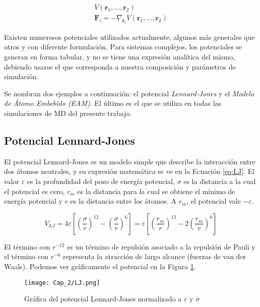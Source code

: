 \begin{eqnarray}
V(\mathbf{r}_{1},...,\mathbf{r}_{2})
\label{C2:eq:pot}\\
\mathbf{F}_{i} = -\nabla_{\mathbf{r}_{i}}V(\mathbf{r}_{1},...,\mathbf{r}_{2})
\label{C2:eq:potfza}
\end{eqnarray}

Existen numerosos potenciales utilizados actualmente, algunos más generales que otros y con diferente formulación. Para sistemas complejos, los potenciales se generan en forma tabular, y no se tiene una expresión analítica del mismo, debiendo usarse el que corresponda a nuestra composición y parámetros de simulación.

Se nombran dos ejemplos a continuación: el potencial \textit{Lennard-Jones} y el \textit{Modelo de Átomo Embebido (EAM)}. El último es el que se utiliza en todas las simulaciones de MD del presente trabajo.

\subsection{Potencial Lennard-Jones}
\label{SS2_3_1}

El potencial Lennard-Jones es un modelo simple que describe la interacción entre dos 	átomos neutrales, y su expresión matemática se ve en la Ecuación \ref{eq:LJ}. El valor $\varepsilon$ es la profundidad del pozo de energía potencial, $\sigma$ es la distancia a la cual el potencial es cero, $r_{m}$ es la distancia para la cual se obtiene el mínimo de energía potencial y $r$ es la distancia entre los átomos. A $r_{m}$, el potencial vale $-\varepsilon$.

\begin{equation}
V_{LJ}=
4\varepsilon \left[ \left( \frac{\sigma}{r} \right)^{12} - \left( \frac{\sigma}{r} \right)^{6} \right] = 
\varepsilon \left[ \left( \frac{r_{m}}{r} \right)^{12} -2 \left( \frac{r_{m}}{r} \right)^{6} \right]
\label{eq:LJ}
\end{equation}

El término con $r^{-12}$ es un término de repulsión asociado a la repulsión de Pauli\footnotemark{} y el término con $r^{-6}$ representa la atracción de largo alcance (fuerzas de van der Waals\footnotemark). Podemos ver gráficamente el potencial en la Figura \ref{C2:fg:LJ}.

\begin{figure}[htp]
\centering
\texttt{[image: Cap\_2/LJ.png]}
\caption[Potencial de Lennard-Jones]{Gráfica del potencial Lennard-Jones normalizado a $\varepsilon$ y $\sigma$}
\label{C2:fg:LJ}
\end{figure}

